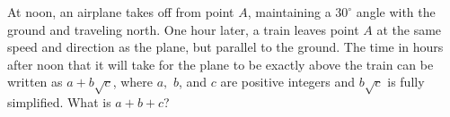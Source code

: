 At noon, an airplane takes off from point $A$, maintaining a $30^{\circ}$ angle with the ground and traveling north. One hour later, a train leaves point $A$ at the same speed and direction as the plane, but parallel to the ground. The time in hours after noon that it will take for the plane to be exactly above the train can be written as $a+b\sqrt{c}$, where $a,$ $b$, and $c$ are positive integers and $b\sqrt{c}$ is fully simplified. What is $a+b+c$?
